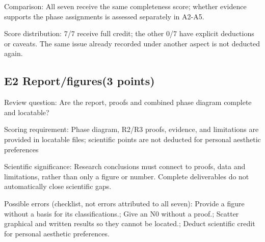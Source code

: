 \documentclass[11pt,a4paper]{article}
\begin{document}
Comparison: All seven receive the same completeness score; whether evidence supports the phase assignments is assessed separately in A2-A5.

Score distribution: 7/\allowbreak{}7 receive full credit; the other 0/\allowbreak{}7 have explicit deductions or caveats. The same issue already recorded under another aspect is not deducted again.

\clearpage
\subsection{E2 Report/\allowbreak{}figures(3 points)}
\label{aspect:E2}
Review question: Are the report,\allowbreak{} proofs and combined phase diagram complete and locatable?

Scoring requirement: Phase diagram,\allowbreak{} R2/\allowbreak{}R3 proofs,\allowbreak{} evidence,\allowbreak{} and limitations are provided in locatable files; scientific points are not deducted for personal aesthetic preferences

Scientific significance: Research conclusions must connect to proofs,\allowbreak{} data and limitations,\allowbreak{} rather than only a figure or number. Complete deliverables do not automatically close scientific gaps.

Possible errors (checklist,\allowbreak{} not errors attributed to all seven): Provide a figure without a basis for its classifications.; Give an N0 without a proof.; Scatter graphical and written results so they cannot be located.; Deduct scientific credit for personal aesthetic preferences.
\end{document}
